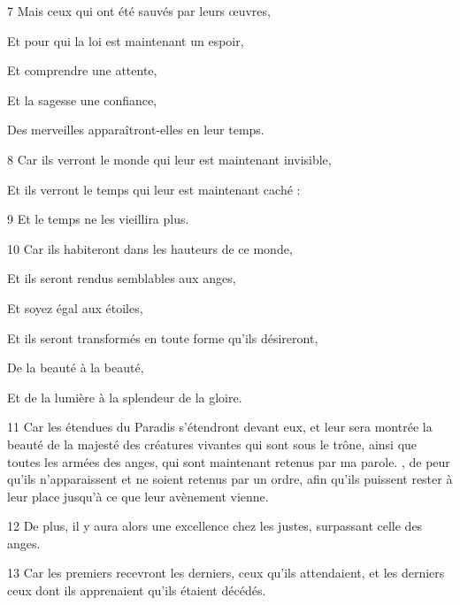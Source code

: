\par 7 Mais ceux qui ont été sauvés par leurs œuvres,

\par Et pour qui la loi est maintenant un espoir,

\par Et comprendre une attente,

\par Et la sagesse une confiance,

\par Des merveilles apparaîtront-elles en leur temps.

\par 8 Car ils verront le monde qui leur est maintenant invisible,

\par Et ils verront le temps qui leur est maintenant caché :

\par 9 Et le temps ne les vieillira plus.

\par 10 Car ils habiteront dans les hauteurs de ce monde,

\par Et ils seront rendus semblables aux anges,

\par Et soyez égal aux étoiles,

\par Et ils seront transformés en toute forme qu'ils désireront,

\par De la beauté à la beauté,

\par Et de la lumière à la splendeur de la gloire.

\par 11 Car les étendues du Paradis s'étendront devant eux, et leur sera montrée la beauté de la majesté des créatures vivantes qui sont sous le trône, ainsi que toutes les armées des anges, qui sont maintenant retenus par ma parole. , de peur qu'ils n'apparaissent et ne soient retenus par un ordre, afin qu'ils puissent rester à leur place jusqu'à ce que leur avènement vienne.

\par 12 De plus, il y aura alors une excellence chez les justes, surpassant celle des anges.

\par 13 Car les premiers recevront les derniers, ceux qu'ils attendaient, et les derniers ceux dont ils apprenaient qu'ils étaient décédés.

